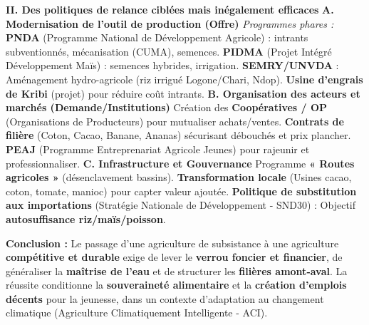 \documentclass[11pt]{article}
\begin{document}
\begin{exoresolu}
\textbf{II. Des politiques de relance ciblées mais inégalement efficaces}
\textbf{A. Modernisation de l'outil de production (Offre)}
\textit{Programmes phares :} \textbf{PNDA} (Programme National de Développement Agricole) : intrants subventionnés, mécanisation (CUMA), semences. \textbf{PIDMA} (Projet Intégré Développement Maïs) : semences hybrides, irrigation. \textbf{SEMRY/UNVDA} : Aménagement hydro-agricole (riz irrigué Logone/Chari, Ndop). \textbf{Usine d'engrais de Kribi} (projet) pour réduire coût intrants.
\textbf{B. Organisation des acteurs et marchés (Demande/Institutions)}
Création des \textbf{Coopératives / OP} (Organisations de Producteurs) pour mutualiser achats/ventes. \textbf{Contrats de filière} (Coton, Cacao, Banane, Ananas) sécurisant débouchés et prix plancher. \textbf{PEAJ} (Programme Entreprenariat Agricole Jeunes) pour rajeunir et professionnaliser.
\textbf{C. Infrastructure et Gouvernance}
Programme \textbf{« Routes agricoles »} (désenclavement bassins). \textbf{Transformation locale} (Usines cacao, coton, tomate, manioc) pour capter valeur ajoutée. \textbf{Politique de substitution aux importations} (Stratégie Nationale de Développement - SND30) : Objectif \textbf{autosuffisance riz/maïs/poisson}.

\textbf{Conclusion :}
Le passage d'une agriculture de subsistance à une agriculture \textbf{compétitive et durable} exige de lever le \textbf{verrou foncier et financier}, de généraliser la \textbf{maîtrise de l'eau} et de structurer les \textbf{filières amont-aval}. La réussite conditionne la \textbf{souveraineté alimentaire} et la \textbf{création d'emplois décents} pour la jeunesse, dans un contexte d'adaptation au changement climatique (Agriculture Climatiquement Intelligente - ACI).
\end{exoresolu}
\end{document}
